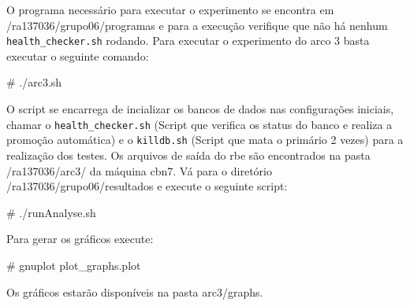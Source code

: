 \documentclass[a4paper,10pt]{article}
\begin{document}
        O programa necessário para executar o experimento se encontra em /ra137036/grupo06/programas e para a execução verifique que não há nenhum \verb|health_checker.sh| rodando. Para executar o experimento do arco 3 basta executar o seguinte comando:
    
    \begin{spverbatim}
# ./arc3.sh
    \end{spverbatim}

    
    O script se encarrega de incializar os bancos de dados nas configurações iniciais, chamar o \verb|health_checker.sh| (Script que verifica os status do banco e realiza a promoção automática) e o \verb|killdb.sh| (Script que mata o primário 2 vezes) para a realização dos testes. Os arquivos de saída do rbe são encontrados na pasta /ra137036/arc3/ da máquina cbn7. Vá para o diretório /ra137036/grupo06/resultados e execute o seguinte script:
    
    \begin{spverbatim}
# ./runAnalyse.sh
    \end{spverbatim}

    Para gerar os gráficos execute:
    \begin{spverbatim}
# gnuplot plot_graphs.plot
    \end{spverbatim}

     Os gráficos estarão disponíveis na pasta arc3/graphs.
\end{document}
